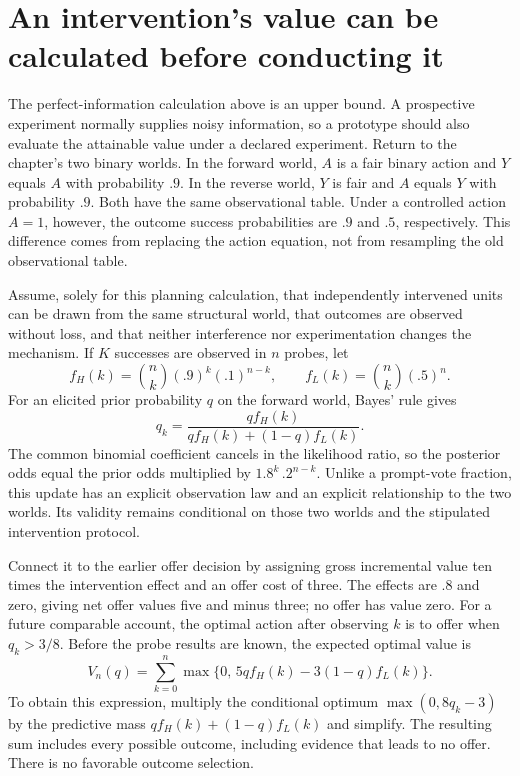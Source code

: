 \section{An intervention's value can be calculated before conducting it}
\label{exec14:l4-finite-information}

The perfect-information calculation above is an upper bound. A prospective
experiment normally supplies noisy information, so a prototype should also
evaluate the attainable value under a declared experiment. Return to the
chapter's two binary worlds. In the forward world, $A$ is a fair binary action
and $Y$ equals $A$ with probability $.9$. In the reverse world, $Y$ is fair
and $A$ equals $Y$ with probability $.9$. Both have the same observational
table. Under a controlled action $A=1$, however, the outcome success
probabilities are $.9$ and $.5$, respectively. This difference comes from
replacing the action equation, not from resampling the old observational
table.

Assume, solely for this planning calculation, that independently intervened
units can be drawn from the same structural world, that outcomes are observed
without loss, and that neither interference nor experimentation changes the
mechanism. If $K$ successes are observed in $n$ probes, let
\[
 f_H(k)=\binom nk(.9)^k(.1)^{n-k},\qquad
 f_L(k)=\binom nk(.5)^n.
\]
For an elicited prior probability $q$ on the forward world, Bayes' rule gives
\[
 q_k=\frac{qf_H(k)}{qf_H(k)+(1-q)f_L(k)}.
\]
The common binomial coefficient cancels in the likelihood ratio, so the
posterior odds equal the prior odds multiplied by
$1.8^k\, .2^{n-k}$. Unlike a prompt-vote fraction, this update has an
explicit observation law and an explicit relationship to the two worlds.
Its validity remains conditional on those two worlds and the stipulated
intervention protocol.

Connect it to the earlier offer decision by assigning gross incremental value
ten times the intervention effect and an offer cost of three. The effects
are $.8$ and zero, giving net offer values five and minus three; no offer
has value zero. For a future comparable account, the optimal action after
observing $k$ is to offer when $q_k>3/8$. Before the probe results are known,
the expected optimal value is
\begin{equation}
 V_n(q)=\sum_{k=0}^n
       \max\{0,\,5qf_H(k)-3(1-q)f_L(k)\}.
 \label{exec14:l4-sample-information-value}
\end{equation}
To obtain this expression, multiply the conditional optimum
$\max(0,8q_k-3)$ by the predictive mass
$qf_H(k)+(1-q)f_L(k)$ and simplify. The resulting sum includes every possible
outcome, including evidence that leads to no offer. There is no favorable
outcome selection.

